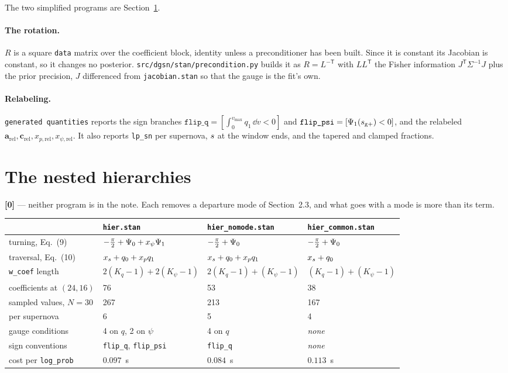 \documentclass[11pt]{article}
\newcommand{\file}[1]{\texttt{#1}}
\newcommand{\code}[1]{\texttt{#1}}
\begin{document}
The two simplified programs are Section~\ref{sec:nested}.

\paragraph{The rotation.} $R$ is a square \code{data} matrix over the coefficient block,
identity unless a preconditioner has been built. Since it is constant its Jacobian is
constant, so it changes no posterior. \file{src/dgsn/stan/precondition.py} builds it as
$R = L^{-\mathsf T}$ with $LL^{\mathsf T}$ the Fisher information
$J^{\mathsf T}\Sigma^{-1}J$ plus the prior precision, $J$ differenced from
\file{jacobian.stan} so that the gauge is the fit's own.

\paragraph{Relabeling.} \code{generated quantities} reports the sign branches
$\code{flip\_q} = [\int_{0}^{v_{\max}} q_{1}\,\dd v < 0]$ and
$\code{flip\_psi} = [\turnone(\arc_{\mathrm{g}+}) < 0]$, and the relabeled
$\mathbf{a}_{\mathrm{rel}}, \mathbf{c}_{\mathrm{rel}}, x_{p,\mathrm{rel}},
x_{\psi,\mathrm{rel}}$. It also reports \code{lp\_sn} per supernova,
$s$ at the window ends, and the tapered and clamped fractions.

\section{The nested hierarchies}
\label{sec:nested}

\textbf{[0]} --- neither program is in the note. Each removes a departure mode of
Section~2.3, and what goes with a mode is more than its term.

\begin{tabular}{llll}
\toprule
 & \file{hier.stan} & \file{hier\_nomode.stan} & \file{hier\_common.stan} \\
\midrule
turning, Eq.~(9)        & $-\frac{\pi}{2} + \Psi_{0} + x_{\psi}\Psi_{1}$
                        & $-\frac{\pi}{2} + \Psi_{0}$
                        & $-\frac{\pi}{2} + \Psi_{0}$ \\
traversal, Eq.~(10)     & $x_{s} + q_{0} + x_p q_{1}$
                        & $x_{s} + q_{0} + x_p q_{1}$
                        & $x_{s} + q_{0}$ \\
\code{w\_coef} length   & $2(K_{q}{-}1) + 2(K_{\psi}{-}1)$
                        & $2(K_{q}{-}1) + (K_{\psi}{-}1)$
                        & $(K_{q}{-}1) + (K_{\psi}{-}1)$ \\
coefficients at $(24,16)$ & 76 & 53 & 38 \\
sampled values, $N = 30$  & 267 & 213 & 167 \\
per supernova           & 6 & 5 & 4 \\
gauge conditions        & 4 on $q$, 2 on $\psi$ & 4 on $q$ & \emph{none} \\
sign conventions        & \code{flip\_q}, \code{flip\_psi} & \code{flip\_q} & \emph{none} \\
cost per \code{log\_prob} & $0.097$~s & $0.084$~s & $0.113$~s \\
\bottomrule
\end{tabular}
\end{document}
